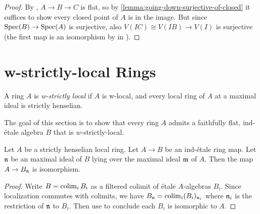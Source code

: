 \begin{proof}
  \leanok
  By , $A \to B \to C$ is flat, so by \ref{lemma:going-down-surjective-of-closed} it suffices
  to show every closed point of $A$ is in the image. But since $\mathrm{Spec}(B) \to \mathrm{Spec}(A)$ is surjective,
  also $V(IC) \cong V(IB) \to V(I)$ is surjective (the first map is an isomorphism by  in ).
\end{proof}


\section{w-strictly-local Rings}

\begin{definition}
    A ring \(A\) is \emph{w-strictly local} if \(A\) is w-local, and every local ring of \(A\) at a
    maximal ideal is strictly henselian.
    \label{def:w-strictly-local-ring}
    \leanok
\end{definition}

The goal of this section is to show that every ring $A$ admits a faithfully flat, ind-étale algebra $B$ that is $w$-strictly-local.

\begin{lemma}
  \label{thm:ind-etale-strictly-henselian-localization-isom}
  Let \(A\) be a strictly henselian local ring. Let \(A \to B\) be an ind-étale ring map.
  Let ${\mathfrak{n}}$ be an maximal ideal of $B$ lying over the maximal ideal ${\mathfrak{m}}$ of $A$.
  Then the map $A \to B_{\mathfrak{n}}$ is isomorphism.
\end{lemma}

\begin{proof}
  Write $B = \operatorname{colim}_i B_i$ as a filtered colimit of étale $A$-algebras $B_i$. Since localization commutes with colimits, we have $B_{\mathfrak{n}} = \operatorname{colim}_i (B_i)_{{\mathfrak{n}}_i}$ where ${\mathfrak{n}}_i$ is the restriction of ${\mathfrak{n}}$ to $B_i$. Then use  to conclude each $B_i$ is isomorphic to $A$.
\end{proof}

